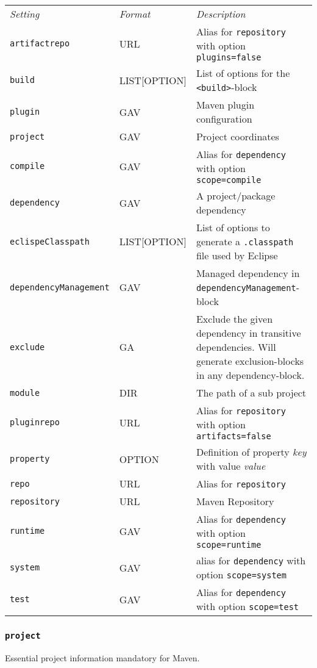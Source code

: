 \documentclass[a4paper,12pt,english,oneside,halfparskip]{scrartcl}
\newcommand{\code}[1]{\texttt{#1}}
\begin{document}
{\small
\begin{tabular}{llp{.50\linewidth}}
\emph{Setting} & \emph{Format} & \emph{Description} \\
\code{artifactrepo} & URL & Alias for \code{repository} with option \code{plugins=false} \\
\code{build} & LIST[OPTION] & List of options for the \code{<build>}-block \\
\code{plugin} & GAV & Maven plugin configuration \\
\code{project} & GAV & Project coordinates \\
\code{compile} & GAV & Alias for \code{dependency} with option \code{scope=compile} \\
\code{dependency} & GAV & A project/package dependency \\
\code{eclispeClasspath} & LIST[OPTION] & List of options to generate a \code{.classpath} file used by Eclipse \\
\code{\small dependencyManagement} & GAV & Managed dependency in \code{dependencyManagement}-block \\
\code{exclude} & GA & Exclude the given dependency in transitive dependencies. Will generate exclusion-blocks in any dependency-block. \\
\code{module} & DIR & The path of a sub project \\
\code{pluginrepo} & URL & Alias for \code{repository} with option \code{artifacts=false} \\
\code{property} & OPTION & Definition of property \emph{key} with value \emph{value} \\
\code{repo} & URL & Alias for \code{repository} \\
\code{repository} & URL & Maven Repository \\
\code{runtime} & GAV & Alias for \code{dependency} with option \code{scope=runtime} \\
\code{system} & GAV & alias for \code{dependency} with option \code{scope=system} \\
\code{test} & GAV & Alias for \code{dependency} with option \code{scope=test} \\
\end{tabular}
}


\subsubsection{\code{project}}

Essential project information mandatory for Maven.
\end{document}

